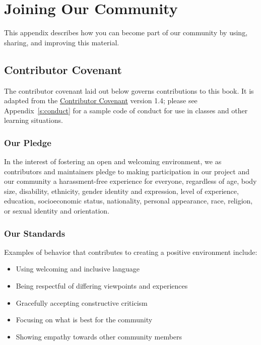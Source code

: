 \chapter{Joining Our Community}\label{s:joining}

This appendix describes how you can become part of our community by
using, sharing, and improving this material.

\section{Contributor Covenant}\label{s:joining-covenant}

The contributor covenant laid out below governs contributions to this
book. It is adapted from the \href{https://www.contributor-covenant.org}{Contributor Covenant} version
1.4; please see Appendix~\ref{s:conduct} for a sample code of conduct
for use in classes and other learning situations.

\subsection{Our Pledge}\label{our-pledge}

In the interest of fostering an open and welcoming environment, we as
contributors and maintainers pledge to making participation in our
project and our community a harassment-free experience for everyone,
regardless of age, body size, disability, ethnicity, gender identity and
expression, level of experience, education, socioeconomic status,
nationality, personal appearance, race, religion, or sexual identity and
orientation.

\subsection{Our Standards}\label{our-standards}

Examples of behavior that contributes to creating a positive environment
include:

\begin{itemize}
\item
  Using welcoming and inclusive language
\item
  Being respectful of differing viewpoints and experiences
\item
  Gracefully accepting constructive criticism
\item
  Focusing on what is best for the community
\item
  Showing empathy towards other community members
\end{itemize}

